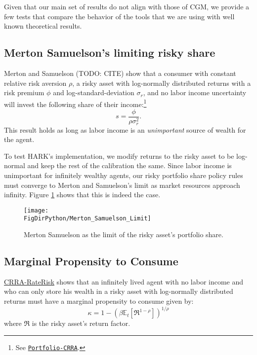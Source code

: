 \documentclass[../CGMPort.tex]{subfiles}
\begin{document}
Given that our main set of results do not align with those of CGM,
we provide a few tests that compare the behavior of the tools that we are using with well known theoretical results.

\subsection{Merton Samuelson's limiting risky share}

Merton and Samuelson (TODO: CITE) show that a consumer with constant relative
risk aversion $\rho$, a risky asset with log-normally distributed returns
with a risk premium $\phi$ and log-standard-deviation $\sigma_r$, and no labor income uncertainty will invest the following share of their income:\footnote{See 
\href{http://www.econ2.jhu.edu/people/ccarroll/public/lecturenotes/AssetPricing/Portfolio-CRRA/}{\texttt{Portfolio-CRRA}}.}
\begin{equation}
	s = \frac{\phi}{\rho \sigma^2_r}.
\end{equation}
This result holds as long as labor income is an \emph{unimportant} source of
wealth for the agent.

To test HARK's implementation, we modify returns to the risky asset to be 
log-normal and keep the rest of the calibration the same. Since labor income
is unimportant for infinitely wealthy agents, our risky portfolio share policy rules must converge to Merton and Samuelson's limit as market resources approach infinity. Figure \ref{fig:MS_share_limit} shows that this is indeed the case.

\begin{figure}[h]
	\texttt{[image: \\FigDirPython/Merton\_Samuelson\_Limit]}
	\caption{Merton Samuelson as the limit of the risky asset's portfolio 
		share.}\label{fig:MS_share_limit}
\end{figure}

\subsection{Marginal Propensity to Consume}

\href{http://www.econ2.jhu.edu/people/ccarroll/public/LectureNotes/Consumption/CRRA-RateRisk/}{CRRA-RateRisk}
shows that an infinitely lived agent with no labor income and who can only 
store his wealth in a risky asset with log-normally distributed
returns must have a marginal propensity to consume given by:
\begin{equation}\label{eq:mpc_limit}
	\kappa = 1 - \left( \beta \mathbb{E}_t \left[ \mathfrak{R}^{1-\rho} \right] 
	\right)	^{1/\rho}
\end{equation}
where $\mathfrak{R}$ is the risky asset's return factor.
\end{document}
